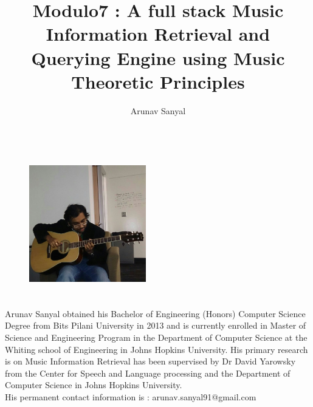 \documentclass[12pt,oneside,final]{thesis}
\begin{document}
\title{Modulo7 : A full stack Music Information Retrieval and Querying Engine using Music Theoretic Principles}
\author{Arunav Sanyal}
\thesis
\masterscience
\copyrightnotice

















\begin{vita}

\begin{figure}
\includegraphics[width=2in,height=2.5in,clip,keepaspectratio]{ArunavSanyal.jpg}
\end{figure}

\noindent Arunav Sanyal obtained his Bachelor of Engineering (Honors) Computer Science Degree from Bits Pilani University in 2013 and is currently enrolled in Master of Science and Engineering Program in the Department of Computer Science at the Whiting school of Engineering in Johns Hopkins University. His primary research is on Music Information Retrieval has been supervised by Dr David Yarowsky from the Center for Speech and Language processing and the Department of Computer Science in Johns Hopkins University. \\

\noindent His permanent contact information is : arunav.sanyal91@gmail.com

\end{vita}
\end{document}
